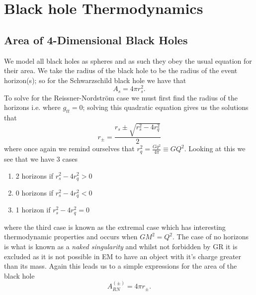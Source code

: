 \documentclass[12pt]{article}
\numberwithin{equation}{section}
\numberwithin{figure}{section}
\begin{document}

\section{Black hole Thermodynamics} %
\label{sec:blackhole_thermodynamics}
\subsection{Area of 4-Dimensional Black Holes} %
\label{sub:area_of_black_holes}
We model all black holes as spheres and as such they obey the usual equation for their area. We take the radius of the black hole to be the radius of the event horizon(s); so for the Schwarzschild black hole we have that 
\begin{equation}
	A_s=4\pi r_s^2.
\end{equation}
To solve for the Reissner-Nordstr\"om case we must first find the radius of the horizons i.e. where $g_{tt}=0$; solving this quadratic equation gives us the solutions that
\begin{equation}
	r_\pm=\frac{r_s\pm \sqrt{r_s^2-4r_q^2}}{2}
\end{equation}
where once again we remind ourselves that $r_q^2=\frac{Gq^2}{4\pi}\equiv GQ^2$. Looking at this we see that we have 3 cases
\begin{enumerate}
	\item 2 horizons if $r_s^2-4r_q^2>0$
	\item 0 horizons if $r_s^2-4r_q^2<0$
	\item 1 horizon if $r_s^2-4r_q^2=0$
\end{enumerate}
where the third case is known as the extremal case which has interesting thermodynamic properties and occurs when $GM^2=Q^2$. The case of no horizons is what is known as a \emph{naked singularity} and whilst not forbidden by GR it is excluded as it is not possible in EM to have an object with it's charge greater than its mass. Again this leads us to a simple expressions for the area of the black hole
\begin{equation}
	A^{(\pm)}_{RN}=4\pi r_{\pm}.
\end{equation}
\end{document}
